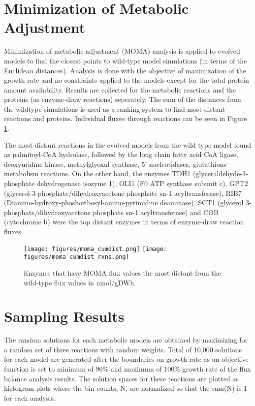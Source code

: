 \section{Minimization of Metabolic Adjustment}

Minimization of metabolic adjustment (MOMA) analysis is applied to evolved models to find the closest points to wild-type model simulations (in terms of the Euclidean distances). Analysis is done with the objective of maximization of the growth rate and no constraints applied to the models except for the total protein amount availability. Results are collected for the metabolic reactions and the proteins (as enzyme-draw reactions) seperately. The sum of the distances from the wildtype simulations is used as a ranking system to find most distant reactions and proteins. Individual fluxes through reactions can be seen in Figure \ref{fig:moma_cumdist}.


 The most distant reactions in the evolved models from the wild type model found as palmitoyl-CoA hydrolase, followed by the long chain fatty acid CoA ligase, deoxyuridine kinase, methylglyoxal synthase, 5' nucleotidases, glutathione metabolism reactions. On the other hand, the enzymes TDH1 (glyceraldehyde-3-phosphate dehydrogenase isozyme 1), OLI1 (F0 ATP synthase subunit c), GPT2 (glycerol-3-phosphate/dihydroxyacetone phosphate sn-1 acyltransferase), RIB7 (Diamino-hydroxy-phoshoribosyl-amino-pyrimidine deaminase), SCT1 (glycerol 3-phosphate/dihydroxyacetone phosphate sn-1 acyltransferase) and COB (cytochrome b) were the top distant enzymes in terms of enzyme-draw reaction fluxes.

\begin{figure}[H]
  \begin{center}
  \texttt{[image: figures/moma\_cumdist.png]}
  \texttt{[image: figures/moma\_cumdist\_rxns.png]}
  \caption[Enzymes that have MOMA flux values the most distant from the wild-type flux values in nmol/gDWh]{Enzymes that have MOMA flux values the most distant from the wild-type flux values in nmol/gDWh.}
  \label{fig:moma_cumdist}
  \end{center}
\end{figure}

\section{Sampling Results}

The random solutions for each metabolic models are obtained by maximizing  for a random set of three reactions with random weights. Total of 10,000 solutions for each model are generated after the boundaries on growth rate as an objective function is set to minimum of 90\% and maximum of 100\% growth rate of the flux balance analysis results. The solution spaces for these reactions are plotted as histogram plots where the bin counts, N, are normalized so that the sum(N) is 1 for each analysis.

